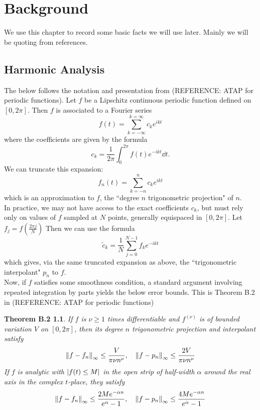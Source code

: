 \chapter{Background\label{chap:two}}

We use this chapter to record some basic facts we will use later.  Mainly we will be quoting from references.

\section{Harmonic Analysis\label{sec:Harmonic}}
The below follows the notation and presentation from (REFERENCE: ATAP for periodic functions).  Let $f$ be a Lipschitz continuous periodic function defined on $[0,2 \pi]$.  Then $f$ is associated to a Fourier series
\[  f(t) = \sum_{k=-\infty}^{k=\infty} c_k e^{ikt}\]
where the coefficients are given by the formula
\[c_k = \frac{1}{2\pi}  \int_{0}^{2\pi} f(t) e^{-ikt} \dd{t}. \]
We can truncate this expansion:
\[f_n(t) = \sum_{k=-n}^{n} c_k e^{ikt}\]
which is an approximation to $f$, the ``degree $n$ trigonometric projection" of $n$.\\
In practice, we may not have access to the exact coefficients $c_k$, but must rely only on values of $f$ sampled at $N$ points, generally equispaced in $[0,2\pi]$. Let $f_j = f \left( \frac{2 \pi j  }{N} \right) $  Then we can use the formula
\[  \tilde{c}_k = \frac{1}{N} \sum_{j=0}^{N-1} f_k e^{-ikt}\] 
 which gives, via the same truncated expansion as above, the ``trigonometric interpolant" $p_n$ to $f$.   \\
 
 Now, if $f$ satisfies some smoothness condition, a standard argument involving repeated integration by parts yields the below error bounds.  This is Theorem B.2 in (REFERENCE: ATAP for periodic functions)
 
 \newtheorem*{ATAPB-2}{Theorem B.2} 
 \begin{ATAPB-2}If $f$ is $\nu \geq 1$ times differentiable and $f^{(\nu)}$ is of bounded 
 variation $V$ on $[0,2\pi]$, then its degree $n$ trigonometric projection and interpolant satisfy
 \[ \norm{f - f_n}_\infty \leq \frac{V}{\pi \nu n^\nu}, \quad \norm{f - p_n}_\infty \leq \frac{2V}{\pi \nu n^\nu} \]
 If $f$ is analytic with $\abs{f(t) \leq M}$ in the open strip of half-width $\alpha$ around the real axis in the complex $t$-place, they satisfy
 \[ \norm{f - f_n}_\infty \leq \frac{2Me^{-\alpha n}}{e^\alpha-1}, \quad \norm{f - p_n}_\infty \leq \frac{4M e^{-\alpha n}}{e^\alpha -1} \]
 \end{ATAPB-2}

